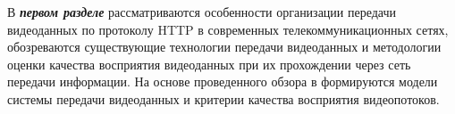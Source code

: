 В \textbf{\textit{первом разделе}} рассматриваются особенности организации передачи видеоданных по протоколу HTTP в современных телекоммуникационных сетях, обозреваются существующие технологии передачи видеоданных и методологии оценки качества восприятия видеоданных при их прохождении через сеть передачи информации. На основе проведенного обзора в формируются модели системы передачи видеоданных и критерии качества восприятия видеопотоков. 


